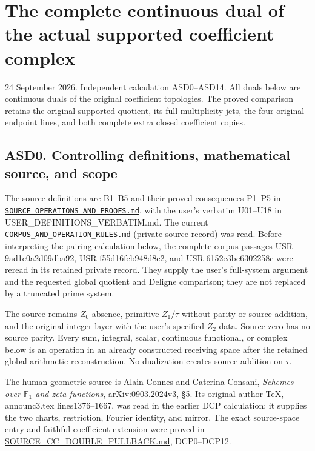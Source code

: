 \section{The complete continuous dual of the actual supported
coefficient
complex}\label{the-complete-continuous-dual-of-the-actual-supported-coefficient-complex}

24 September 2026. Independent calculation ASD0--ASD14. All duals below
are continuous duals of the original coefficient topologies. The proved
comparison retains the original supported quotient, its full
multiplicity jets, the four original endpoint lines, and both complete
extra closed coefficient copies.

\subsection{ASD0. Controlling definitions, mathematical source, and
scope}\label{asd0.-controlling-definitions-mathematical-source-and-scope}

The source definitions are B1--B5 and their proved consequences P1--P5
in
\href{../foundations/user_definitions_20260924/SOURCE_OPERATIONS_AND_PROOFS.md}{\nolinkurl{SOURCE_OPERATIONS_AND_PROOFS.md}},
with the user's verbatim U01--U18 in
{USER\_DEFINITIONS\_VERBATIM.md}.
The current \nolinkurl{CORPUS_AND_OPERATION_RULES.md} (private source record) was read. Before
interpreting the pairing calculation below, the complete corpus passages
USR-9ad1c0a2d09dba92, USR-f55d16feb948d8c2, and USR-6152e3bc6302258c
were reread in its retained private record. They supply the user's
full-system argument and the requested global quotient and Deligne
comparison; they are not replaced by a truncated prime system.

The source remains \(Z_0\) absence, primitive \(Z_1/\tau\) without
parity or source addition, and the original integer layer with the
user's specified \(Z_2\) data. Source zero has no source parity. Every
sum, integral, scalar, continuous functional, or complex below is an
operation in an already constructed receiving space after the retained
global arithmetic reconstruction. No dualization creates source addition
on \(\tau\).

The human geometric source is Alain Connes and Caterina Consani,
\href{https://arxiv.org/abs/0903.2024v3}{\emph{Schemes over
\(\mathbb F_1\) and zeta functions}, arXiv:0903.2024v3, §5}. Its
original author TeX, announc3.tex lines1376--1667, was read in the
earlier DCP calculation; it supplies the two charts, restriction,
Fourier identity, and mirror. The exact source-space entry and faithful
coefficient extension were proved in \url{SOURCE_CC_DOUBLE_PULLBACK.md},
DCP0--DCP12.

